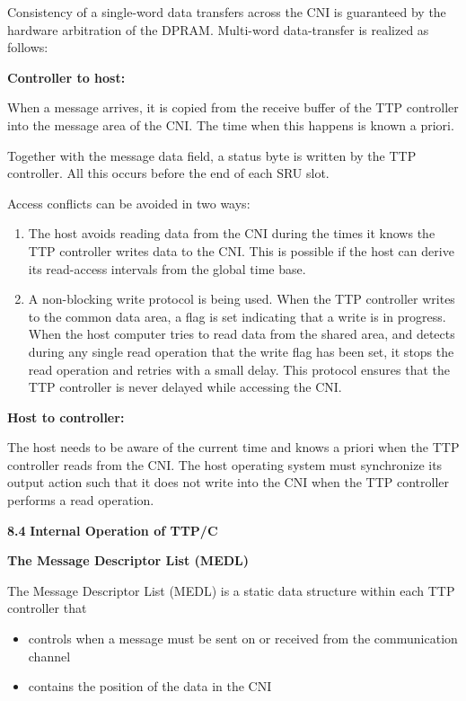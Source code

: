 Consistency of a single-word data transfers across the CNI is guaranteed
by the hardware arbitration of the DPRAM. Multi-word data-transfer is
realized as follows:

\textbf{Controller to host:}

When a message arrives, it is copied from the receive buffer of the TTP
controller into the message area of the CNI. The time when this happens
is known a priori.

Together with the message data field, a status byte is written by the
TTP controller. All this occurs before the end of each SRU slot.

Access conflicts can be avoided in two ways:

\begin{enumerate}
\def\labelenumi{\arabic{enumi}.}
\item
  The host avoids reading data from the CNI during the times it knows
  the TTP controller writes data to the CNI. This is possible if the
  host can derive its read-access intervals from the global time base.
\item
  A non-blocking write protocol is being used. When the TTP controller
  writes to the common data area, a flag is set indicating that a write
  is in progress. When the host computer tries to read data from the
  shared area, and detects during any single read operation that the
  write flag has been set, it stops the read operation and retries with
  a small delay. This protocol ensures that the TTP controller is never
  delayed while accessing the CNI.
\end{enumerate}

\textbf{Host to controller:}

The host needs to be aware of the current time and knows a priori when
the TTP controller reads from the CNI. The host operating system must
synchronize its output action such that it does not write into the CNI
when the TTP controller performs a read operation.

\textbf{8.4} \protect\hypertarget{teil5}{}{}\textbf{Internal Operation
of TTP/C}

\textbf{The Message Descriptor List (MEDL)}

The Message Descriptor List (MEDL) is a static data structure within
each TTP controller that

\begin{itemize}
\item
  controls when a message must be sent on or received from the
  communication channel
\item
  contains the position of the data in the CNI
\end{itemize}

